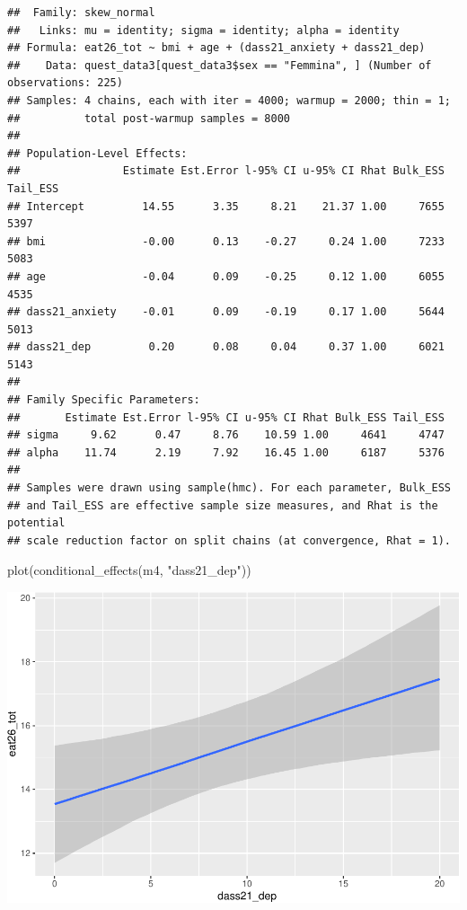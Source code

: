 \documentclass[
]{article}
\newenvironment{Shaded}{\begin{snugshade}}{\end{snugshade}}
\newcommand{\FunctionTok}[1]{\textcolor[rgb]{0.00,0.00,0.00}{#1}}
\newcommand{\NormalTok}[1]{#1}
\newcommand{\StringTok}[1]{\textcolor[rgb]{0.31,0.60,0.02}{#1}}
\begin{document}
\begin{verbatim}
##  Family: skew_normal 
##   Links: mu = identity; sigma = identity; alpha = identity 
## Formula: eat26_tot ~ bmi + age + (dass21_anxiety + dass21_dep) 
##    Data: quest_data3[quest_data3$sex == "Femmina", ] (Number of observations: 225) 
## Samples: 4 chains, each with iter = 4000; warmup = 2000; thin = 1;
##          total post-warmup samples = 8000
## 
## Population-Level Effects: 
##                Estimate Est.Error l-95% CI u-95% CI Rhat Bulk_ESS Tail_ESS
## Intercept         14.55      3.35     8.21    21.37 1.00     7655     5397
## bmi               -0.00      0.13    -0.27     0.24 1.00     7233     5083
## age               -0.04      0.09    -0.25     0.12 1.00     6055     4535
## dass21_anxiety    -0.01      0.09    -0.19     0.17 1.00     5644     5013
## dass21_dep         0.20      0.08     0.04     0.37 1.00     6021     5143
## 
## Family Specific Parameters: 
##       Estimate Est.Error l-95% CI u-95% CI Rhat Bulk_ESS Tail_ESS
## sigma     9.62      0.47     8.76    10.59 1.00     4641     4747
## alpha    11.74      2.19     7.92    16.45 1.00     6187     5376
## 
## Samples were drawn using sample(hmc). For each parameter, Bulk_ESS
## and Tail_ESS are effective sample size measures, and Rhat is the potential
## scale reduction factor on split chains (at convergence, Rhat = 1).
\end{verbatim}

\begin{Shaded}
\begin{Highlighting}[]
\FunctionTok{plot}\NormalTok{(}\FunctionTok{conditional\_effects}\NormalTok{(m4, }\StringTok{"dass21\_dep"}\NormalTok{))}
\end{Highlighting}
\end{Shaded}

\includegraphics{050_quest_groups_files/figure-latex/unnamed-chunk-2-7.pdf}
\end{document}
